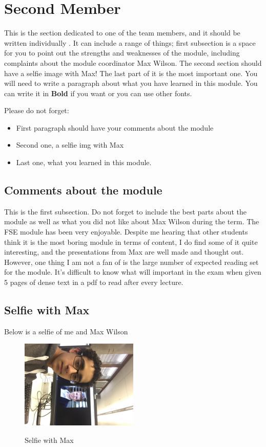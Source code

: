 \section{Second Member}
This is the section dedicated to one of the team members, and it should be written individually . It can include a range of things; first subsection is a space for you to point out the strengths and weaknesses of the module, including complaints about the module coordinator Max Wilson. The second section should have a selfie image with Max! The last part of it is the most important one. You will need to write a paragraph about what you have learned in this module. You can write it in \textbf{Bold} if you want or you can use other fonts. 

Please do not forget:
\begin{itemize}
	\item First paragraph should have your comments about the module
	\item Second one, a selfie img with Max
	\item Last one, what you learned in this module.
\end{itemize}

\subsection{Comments about the module}
This is the first subsection. Do not forget to include the best parts about the module as well as what you did not like about Max Wilson during the term.
The FSE module has been very enjoyable. Despite me hearing that other students think it is the most boring module in terms of content, I do find some of it quite interesting, and the presentations from Max are well made and thought out. However, one thing I am not a fan of is the large number of expected reading set for the module. It's difficult to know what will important in the exam when given 5 pages of dense text in a pdf to read after every lecture.

\subsection{Selfie with Max}
Below is a selfie of me and Max Wilson
\begin{figure}[h]
\caption{Selfie with Max}
\centering
\includegraphics[width=0.5\textwidth]{psyit_real_selfie}
\label{fig:selfie}
\end{figure}

